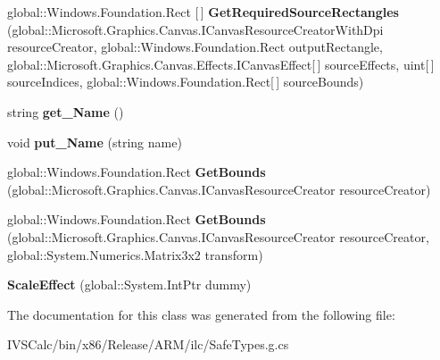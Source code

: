\begin{DoxyCompactItemize}
\item 
\mbox{\label{class_microsoft_1_1_graphics_1_1_canvas_1_1_effects_1_1_scale_effect_acf3c16b455fe4e77a516bc4a6eba2485}} 
global\+::\+Windows.\+Foundation.\+Rect \mbox{[}$\,$\mbox{]} {\bfseries Get\+Required\+Source\+Rectangles} (global\+::\+Microsoft.\+Graphics.\+Canvas.\+I\+Canvas\+Resource\+Creator\+With\+Dpi resource\+Creator, global\+::\+Windows.\+Foundation.\+Rect output\+Rectangle, global\+::\+Microsoft.\+Graphics.\+Canvas.\+Effects.\+I\+Canvas\+Effect\mbox{[}$\,$\mbox{]} source\+Effects, uint\mbox{[}$\,$\mbox{]} source\+Indices, global\+::\+Windows.\+Foundation.\+Rect\mbox{[}$\,$\mbox{]} source\+Bounds)
\item 
\mbox{\label{class_microsoft_1_1_graphics_1_1_canvas_1_1_effects_1_1_scale_effect_a21ead71135a091b18a9e44dc7b726545}} 
string {\bfseries get\+\_\+\+Name} ()
\item 
\mbox{\label{class_microsoft_1_1_graphics_1_1_canvas_1_1_effects_1_1_scale_effect_a96ed177341b5fae8aa045d1180612122}} 
void {\bfseries put\+\_\+\+Name} (string name)
\item 
\mbox{\label{class_microsoft_1_1_graphics_1_1_canvas_1_1_effects_1_1_scale_effect_aef495be4cc434f0957e8f145ef37b21f}} 
global\+::\+Windows.\+Foundation.\+Rect {\bfseries Get\+Bounds} (global\+::\+Microsoft.\+Graphics.\+Canvas.\+I\+Canvas\+Resource\+Creator resource\+Creator)
\item 
\mbox{\label{class_microsoft_1_1_graphics_1_1_canvas_1_1_effects_1_1_scale_effect_ac812749c1188d452c370ee34889c77ef}} 
global\+::\+Windows.\+Foundation.\+Rect {\bfseries Get\+Bounds} (global\+::\+Microsoft.\+Graphics.\+Canvas.\+I\+Canvas\+Resource\+Creator resource\+Creator, global\+::\+System.\+Numerics.\+Matrix3x2 transform)
\item 
\mbox{\label{class_microsoft_1_1_graphics_1_1_canvas_1_1_effects_1_1_scale_effect_a63b8f5ef597fdfd4087268208b2e4c4e}} 
{\bfseries Scale\+Effect} (global\+::\+System.\+Int\+Ptr dummy)
\end{DoxyCompactItemize}


The documentation for this class was generated from the following file\+:\begin{DoxyCompactItemize}
\item 
I\+V\+S\+Calc/bin/x86/\+Release/\+A\+R\+M/ilc/Safe\+Types.\+g.\+cs\end{DoxyCompactItemize}
